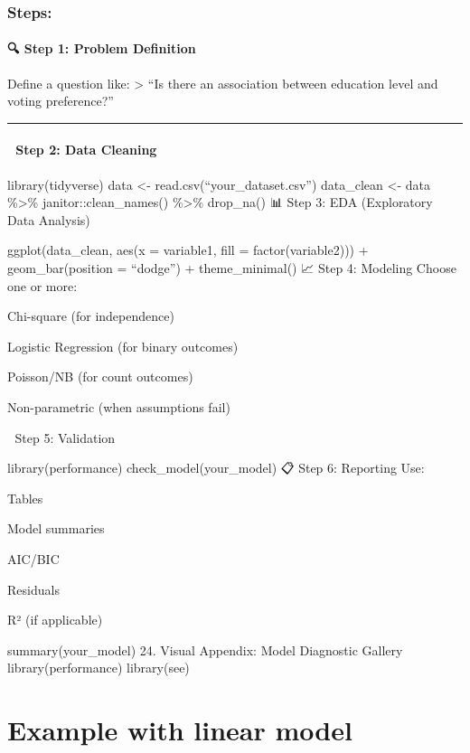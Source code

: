 \documentclass[
  letterpaper,
  DIV=11,
  numbers=noendperiod]{scrreprt}
\begin{document}
{\subsection{Steps:}\label{steps}

\subsubsection{🔍 Step 1: Problem
Definition}\label{step-1-problem-definition}

Define a question like: \textgreater{} ``Is there an association between
education level and voting preference?''

\begin{center}\rule{0.5\linewidth}{0.5pt}\end{center}

\subsubsection{🧹 Step 2: Data Cleaning}\label{step-2-data-cleaning}

library(tidyverse) data \textless- read.csv(``your\_dataset.csv'')
data\_clean \textless- data \%\textgreater\% janitor::clean\_names()
\%\textgreater\% drop\_na() 📊 Step 3: EDA (Exploratory Data Analysis)

ggplot(data\_clean, aes(x = variable1, fill = factor(variable2))) +
geom\_bar(position = ``dodge'') + theme\_minimal() 📈 Step 4: Modeling
Choose one or more:

Chi-square (for independence)

Logistic Regression (for binary outcomes)

Poisson/NB (for count outcomes)

Non-parametric (when assumptions fail)

🧪 Step 5: Validation

library(performance) check\_model(your\_model) 📋 Step 6: Reporting Use:

Tables

Model summaries

AIC/BIC

Residuals

R² (if applicable)

summary(your\_model) 24. Visual Appendix: Model Diagnostic Gallery
library(performance) library(see)


\chapter{Example with linear model}\label{example-with-linear-model}

}
\end{document}
